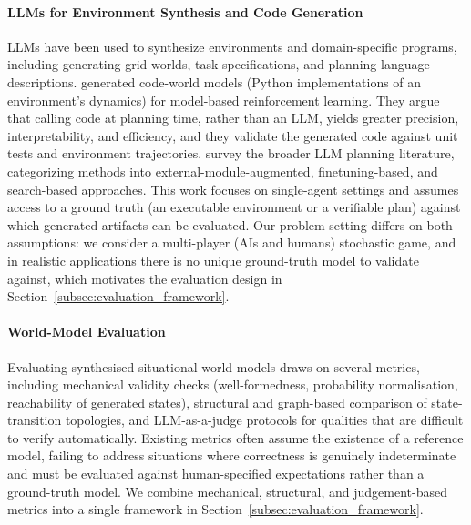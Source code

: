 \documentclass{article}
\begin{document}
\paragraph{LLMs for Environment Synthesis and Code Generation}
LLMs have been used to synthesize environments and domain-specific programs, including generating grid worlds, task specifications, and planning-language descriptions. \citet{dainese2024generating} generated code-world models (Python implementations of an environment's dynamics) for model-based reinforcement learning. They argue that calling code at planning time, rather than an LLM, yields greater precision, interpretability, and efficiency, and they validate the generated code against unit tests and environment trajectories. \citet{cao2025large} survey the broader LLM planning literature, categorizing methods into external-module-augmented, finetuning-based, and search-based approaches. This work focuses on single-agent settings and assumes access to a ground truth (an executable environment or a verifiable plan) against which generated artifacts can be evaluated. Our problem setting differs on both assumptions: we consider a multi-player (AIs and humans) stochastic game, and in realistic applications there is no unique ground-truth model to validate against, which motivates the evaluation design in Section~\ref{subsec:evaluation_framework}.

\paragraph{World-Model Evaluation}
Evaluating synthesised situational world models draws on several metrics, including mechanical validity checks (well-formedness, probability normalisation, reachability of generated states), structural and graph-based comparison of state-transition topologies, and LLM-as-a-judge protocols for qualities that are difficult to verify automatically. Existing metrics often assume the existence of a reference model, failing to address situations where correctness is genuinely indeterminate and must be evaluated against human-specified expectations rather than a ground-truth model. We combine mechanical, structural, and judgement-based metrics into a single framework in Section~\ref{subsec:evaluation_framework}.
\end{document}
